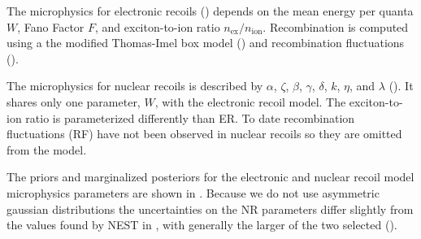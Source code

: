 The microphysics for electronic recoils () depends on the mean energy
per quanta $W$, Fano Factor $F$, and exciton-to-ion ratio $n_{\mathrm{ex}} / n_{\mathrm{ion}}$.  Recombination is computed using
a the modified Thomas-Imel box model () and recombination fluctuations
().

The microphysics for nuclear recoils is described by $\alpha$, $\zeta$, $\beta$, $\gamma$, $\delta$, $k$, $\eta$, and $\lambda$
().  It shares only one
parameter, $W$, with the electronic recoil model.  The exciton-to-ion ratio is parameterized differently than ER.  To date
recombination fluctuations (RF) have not been observed in nuclear recoils so they are omitted from the model.

The priors and marginalized posteriors for the electronic and nuclear recoil model microphysics parameters are shown in
.  Because we
do not use asymmetric gaussian distributions the uncertainties on the NR parameters differ slightly from the values
found by NEST in , with generally the larger of the two selected
().

